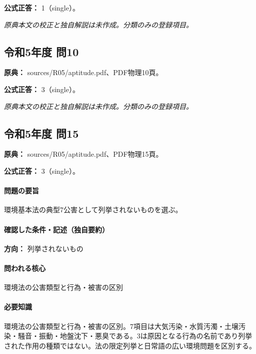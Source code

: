 \textbf{公式正答：} 1（single）。

\par\textit{原典本文の校正と独自解説は未作成。分類のみの登録項目。}

\subsection{令和5年度 問10}
\label{q:r05-reg-apt-10}

\noindent\textbf{原典：} sources/R05/aptitude.pdf、PDF物理10頁。

\textbf{公式正答：} 3（single）。

\par\textit{原典本文の校正と独自解説は未作成。分類のみの登録項目。}

\subsection{令和5年度 問15}
\label{q:r05-reg-apt-15}

\noindent\textbf{原典：} sources/R05/aptitude.pdf、PDF物理15頁。

\textbf{公式正答：} 3（single）。

\paragraph{問題の要旨} 環境基本法の典型7公害として列挙されないものを選ぶ。

\paragraph{確認した条件・記述（独自要約）}\mbox{}\par

\noindent\textbf{方向：} 列挙されないもの\par

\paragraph{問われる核心} 環境法の公害類型と行為・被害の区別

\paragraph{必要知識} 環境法の公害類型と行為・被害の区別。7項目は大気汚染・水質汚濁・土壌汚染・騒音・振動・地盤沈下・悪臭である。3は原因となる行為の名前であり列挙された作用の種類ではない。法の限定列挙と日常語の広い環境問題を区別する。

